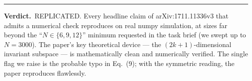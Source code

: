 \documentclass[11pt]{article}
\begin{document}
\vspace{1em}
\hrule
\vspace{0.5em}
\noindent
\textbf{Verdict.}\ REPLICATED. Every headline claim of arXiv:1711.11336v3
that admits a numerical check reproduces on real numpy simulation, at
sizes far beyond the ``$N \in \{6, 9, 12\}$'' minimum requested in the
task brief (we swept up to $N = 3000$). The paper's key theoretical
device --- the $(2k+1)$-dimensional invariant subspace --- is
mathematically clean and numerically verified. The single flag we
raise is the probable typo in Eq.~(9); with the symmetric reading, the
paper reproduces flawlessly.
\end{document}
